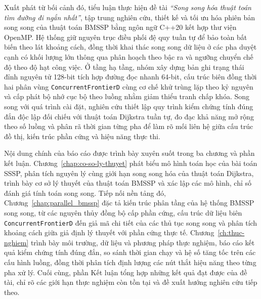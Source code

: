 \documentclass[12pt,a4paper,openany,oneside]{report}
\theoremstyle{plain}
\numberwithin{equation}{section}
\begin{document}
Xuất phát từ bối cảnh đó, tiểu luận thực hiện đề tài \textit{``Song song hóa
thuật toán tìm đường đi ngắn nhất''}, tập trung nghiên cứu, thiết kế và tối ưu
hóa phiên bản song song của thuật toán BMSSP bằng ngôn ngữ C++20 kết hợp thư
viện OpenMP. Hệ thống giữ nguyên trục điều phối đệ quy tuần tự để bảo toàn bất
biến theo lát khoảng cách, đồng thời khai thác song song dữ liệu ở các pha duyệt
cạnh có khối lượng lớn thông qua phân hoạch theo bậc ra và ngưỡng chuyển chế độ
theo độ hạt công việc. Ở tầng hạ tầng, nhóm xây dựng bản ghi trạng thái đỉnh
nguyên tử 128-bit tích hợp đường đọc nhanh 64-bit, cấu trúc biên đồng thời hai
phân vùng \texttt{Concurrent\allowbreak FrontierD} cùng cơ chế khử trùng lặp
theo kỷ nguyên và cấp phát bộ nhớ cục bộ theo luồng nhằm giảm thiểu tranh chấp
khóa. Song song với quá trình cài đặt, nghiên cứu thiết lập quy trình kiểm chứng
tính đúng đắn độc lập đối chiếu với thuật toán Dijkstra tuần tự, đo đạc khả năng
mở rộng theo số luồng và phân rã thời gian từng pha để làm rõ mối liên hệ giữa
cấu trúc đồ thị, kiến trúc phần cứng và hiệu năng thực thi.

Nội dung chính của báo cáo được trình bày xuyên suốt trong ba chương và phần kết
luận. Chương~\ref{chap:co-so-ly-thuyet} phát biểu mô hình toán học của bài toán
SSSP, phân tích nguyên lý cùng giới hạn song song hóa của thuật toán Dijkstra,
trình bày cơ sở lý thuyết của thuật toán BMSSP và xác lập các mô hình, chỉ số
đánh giá tính toán song song. Tiếp nối nền tảng đó,
Chương~\ref{chap:parallel_bmssp} đặc tả kiến trúc phân tầng của hệ thống BMSSP
song song, từ các nguyên thủy đồng bộ cấp phần cứng, cấu trúc dữ liệu biên
\texttt{Concurrent\allowbreak FrontierD} đến giả mã chi tiết của các thủ tục
song song và phân tích khoảng cách giữa giả định lý thuyết với phần cứng thực
tế. Chương~\ref{ch:thuc-nghiem} trình bày môi trường, dữ liệu và phương pháp
thực nghiệm, báo cáo kết quả kiểm chứng tính đúng đắn, so sánh thời gian chạy và
hệ số tăng tốc trên các cấu hình luồng, đồng thời phân tích định lượng các nút
thắt hiệu năng theo từng pha xử lý. Cuối cùng, phần Kết luận tổng hợp những kết
quả đạt được của đề tài, chỉ rõ các giới hạn thực nghiệm còn tồn tại và đề xuất
hướng nghiên cứu tiếp theo.

\newpage






\end{document}
